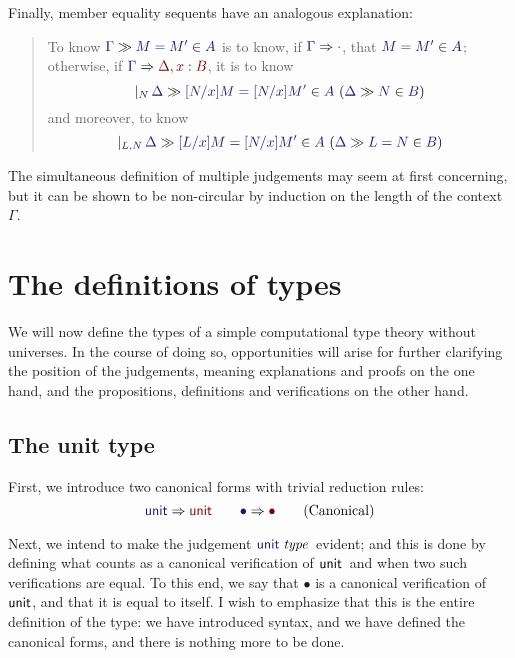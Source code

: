 \documentclass[main.tex]{subfiles}
\begin{document}
Finally, member equality sequents have an analogous explanation:

\begin{quote}
  To know $\sequent{\Gamma}{\ver{M=M'}{A}}$ is to know, if
  $\reduce{\Gamma}{\cdot}$, that $\ver{M=M'}{A}$; otherwise, if
  $\reduce{\Gamma}{\Delta,x:B}$, it is to know
  \[
    \genj{N}{
      \hyp{
        \sequent{\Delta}{
          \ver{[N/x]M=[N/x]M'}{A}
        }
      }{
        \sequent{\Delta}{
          \ver{N}{B}
        }
      }
    }
  \]
  and moreover, to know
  \[
    \genj{L,N}{
      \hyp{
        \sequent{\Delta}{
          \ver{[L/x]M=[N/x]M'}{A}
        }
      }{
        \sequent{\Delta}{
          \ver{L=N}{B}
        }
      }
    }
  \]
\end{quote}

The simultaneous definition of multiple judgements may seem at first
concerning, but it can be shown to be non-circular by induction on the length
of the context $\Gamma$.

\section{The definitions of types}

We will now define the types of a simple computational type theory without
universes. In the course of doing so, opportunities will arise for further
clarifying the position of the judgements, meaning explanations and proofs on
the one hand, and the propositions, definitions and verifications on the other
hand.

\subsection{The unit type}

First, we introduce two canonical forms with trivial reduction rules:
\begin{equation}
  \reduce\tyunit\tyunit\qquad
  \reduce\bullet\bullet
  \tag{Canonical}
\end{equation}

Next, we intend to make the judgement $\isset\tyunit$\ evident; and this is done by
defining what counts as a canonical verification of $\mathsf{unit}$\ and when two such
verifications are equal. To this end, we say that $\bullet$ is a canonical
verification of $\mathsf{unit}$, and that it is equal to itself.  I wish to emphasize
that this is the entire definition of the type: we have introduced syntax, and
we have defined the canonical forms, and there is nothing more to be done.
\end{document}
